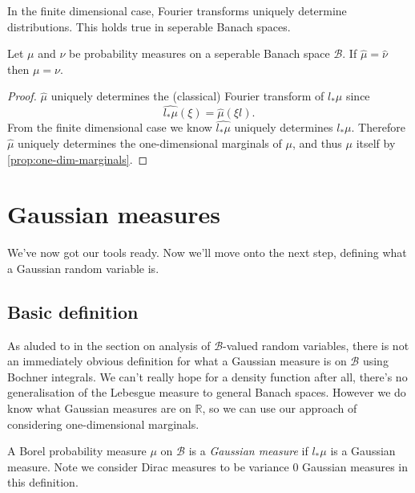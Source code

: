 \documentclass[fontsize=12pt, DIV=10]{scrreprt}
\theoremstyle{remark}
\newcommand{\R}{\mathbb R}
\newcommand{\calB}{\mathcal B}
\begin{document}
In the finite dimensional case, Fourier transforms uniquely determine distributions. This holds true in seperable Banach spaces.
\begin{prop}
	Let $\mu$ and $\nu$ be probability measures on a seperable Banach space $\calB$. If $\hat{\mu} = \hat{\nu}$ then $\mu = \nu$.
\end{prop}
\begin{proof}
	$\hat{\mu}$ uniquely determines the (classical) Fourier transform of $l_* \mu$ since
	\begin{equation}
		\widehat{l_* \mu}(\xi) = \hat{\mu}(\xi l).
	\end{equation}
	From the finite dimensional case we know $\widehat{l_* \mu}$ uniquely determines $l_* \mu$. Therefore $\hat{\mu}$ uniquely determines the one-dimensional marginals of $\mu$, and thus $\mu$ itself by \vref{prop:one-dim-marginals}.
\end{proof}

\section{Gaussian measures}

We've now got our tools ready. Now we'll move onto the next step, defining what a Gaussian random variable is.

\subsection{Basic definition}

As aluded to in the section on analysis of $\calB$-valued random variables, there is not an immediately obvious definition for what a Gaussian measure is on $\calB$ using Bochner integrals. We can't really hope for a density function after all, there's no generalisation of the Lebesgue measure to general Banach spaces. However we do know what Gaussian measures are on $\R$, so we can use our approach of considering one-dimensional marginals.
\begin{defn}
	A Borel probability measure $\mu$ on $\calB$ is a \emph{Gaussian measure} if $l_* \mu$ is a Gaussian measure. Note we consider Dirac measures to be variance 0 Gaussian measures in this definition.
\end{defn}
\end{document}

